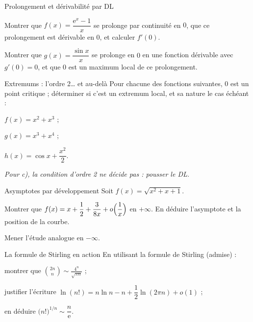 \begin{exercice}[2]{Prolongement et dérivabilité par DL}
\begin{questions}
  \item Montrer que $f(x)=\dfrac{\mathrm{e}^{x}-1}{x}$ se prolonge par
    continuité en $0$, que ce prolongement est dérivable en $0$, et calculer
    $f'(0)$.
  \item Montrer que $g(x)=\dfrac{\sin x}{x}$ se prolonge en $0$ en une
    fonction dérivable avec $g'(0)=0$, et que $0$ est un maximum local de
    ce prolongement.
\end{questions}
\end{exercice}

\begin{exercice}[2]{Extremums : l'ordre 2… et au-delà}
Pour chacune des fonctions suivantes, $0$ est un point critique ; déterminer
si c'est un extremum local, et sa nature le cas échéant :
\begin{questions}
  \item $f(x)=x^{2}+x^{3}$ ;
  \item $g(x)=x^{3}+x^{4}$ ;
  \item $h(x)=\cos x+\dfrac{x^{2}}{2}$.
\end{questions}
\emph{Pour c), la condition d'ordre 2 ne décide pas : pousser le DL.}
\end{exercice}

\begin{exercice}[2]{Asymptotes par développement}
Soit $f(x)=\sqrt{x^{2}+x+1}$.
\begin{questions}
  \item Montrer que $f(x)=x+\dfrac12+\dfrac{3}{8x}+o\Bigl(\dfrac1x\Bigr)$
    en $+\infty$. En déduire l'asymptote et la position de la courbe.
  \item Mener l'étude analogue en $-\infty$.
\end{questions}
\end{exercice}

\begin{exercice}[2]{La formule de Stirling en action}
En utilisant la formule de Stirling (admise) :
\begin{questions}
  \item montrer que $\displaystyle\binom{2n}{n}\sim\frac{4^{n}}{\sqrt{\pi n}}$ ;
  \item justifier l'écriture
    $\ln(n!)=n\ln n-n+\dfrac12\ln(2\pi n)+o(1)$ ;
  \item en déduire $\bigl(n!\bigr)^{1/n}\sim\dfrac{n}{\mathrm{e}}$.
\end{questions}
\end{exercice}

